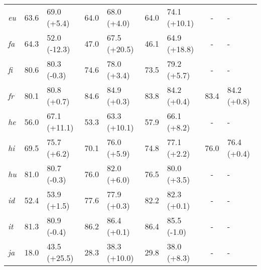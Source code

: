 \documentclass[11pt,dvipsnames]{article}
\begin{document}
\begin{table*}[ht!]
\begin{tabular}{lcccccccccccc}
\textit{eu}&63.6&\multicolumn{2}{l}{\cellcolor[HTML]{7DCEA0} 69.0 (+5.4)}&64.0&\multicolumn{2}{l}{\cellcolor[HTML]{A9DFBF} 68.0 (+4.0)}&64.0&\multicolumn{2}{l}{\cellcolor[HTML]{52BE80} 74.1 (+10.1)}&-&\multicolumn{2}{l}{-}\\
\textit{fa}&64.3&\multicolumn{2}{l}{\cellcolor[HTML]{F1948A} 52.0 (-12.3)}&47.0&\multicolumn{2}{l}{\cellcolor[HTML]{52BE80} 67.5 (+20.5)}&46.1&\multicolumn{2}{l}{\cellcolor[HTML]{52BE80} 64.9 (+18.8)}&-&\multicolumn{2}{l}{-}\\
\textit{fi}&80.6&\multicolumn{2}{l}{\cellcolor[HTML]{FDEDEC} 80.3 (-0.3)}&74.6&\multicolumn{2}{l}{\cellcolor[HTML]{A9DFBF} 78.0 (+3.4)}&73.5&\multicolumn{2}{l}{\cellcolor[HTML]{7DCEA0} 79.2 (+5.7)}&-&\multicolumn{2}{l}{-}\\
\textit{fr}&80.1&\multicolumn{2}{l}{\cellcolor[HTML]{E9F7EF} 80.8 (+0.7)}&84.6&\multicolumn{2}{l}{\cellcolor[HTML]{E9F7EF} 84.9 (+0.3)}&83.8&\multicolumn{2}{l}{\cellcolor[HTML]{E9F7EF} 84.2 (+0.4)}&83.4&\multicolumn{2}{l}{\cellcolor[HTML]{E9F7EF} 84.2 (+0.8)}\\
\textit{he}&56.0&\multicolumn{2}{l}{\cellcolor[HTML]{52BE80} 67.1 (+11.1)}&53.3&\multicolumn{2}{l}{\cellcolor[HTML]{52BE80} 63.3 (+10.1)}&57.9&\multicolumn{2}{l}{\cellcolor[HTML]{7DCEA0} 66.1 (+8.2)}&-&\multicolumn{2}{l}{-}\\
\textit{hi}&69.5&\multicolumn{2}{l}{\cellcolor[HTML]{7DCEA0} 75.7 (+6.2)}&70.1&\multicolumn{2}{l}{\cellcolor[HTML]{7DCEA0} 76.0 (+5.9)}&74.8&\multicolumn{2}{l}{\cellcolor[HTML]{A9DFBF} 77.1 (+2.2)}&76.0&\multicolumn{2}{l}{\cellcolor[HTML]{E9F7EF} 76.4 (+0.4)}\\
\textit{hu}&81.0&\multicolumn{2}{l}{\cellcolor[HTML]{FDEDEC} 80.7 (-0.3)}&76.0&\multicolumn{2}{l}{\cellcolor[HTML]{7DCEA0} 82.0 (+6.0)}&76.5&\multicolumn{2}{l}{\cellcolor[HTML]{A9DFBF} 80.0 (+3.5)}&-&\multicolumn{2}{l}{-}\\
\textit{id}&52.4&\multicolumn{2}{l}{\cellcolor[HTML]{A9DFBF} 53.9 (+1.5)}&77.6&\multicolumn{2}{l}{\cellcolor[HTML]{E9F7EF} 77.9 (+0.3)}&82.2&\multicolumn{2}{l}{\cellcolor[HTML]{E9F7EF} 82.3 (+0.1)}&-&\multicolumn{2}{l}{-}\\
\textit{it}&81.3&\multicolumn{2}{l}{\cellcolor[HTML]{FDEDEC} 80.9 (-0.4)}&86.2&\multicolumn{2}{l}{\cellcolor[HTML]{E9F7EF} 86.4 (+0.1)}&86.4&\multicolumn{2}{l}{\cellcolor[HTML]{FADBD8} 85.5 (-1.0)}&-&\multicolumn{2}{l}{-}\\
\textit{ja}&18.0&\multicolumn{2}{l}{\cellcolor[HTML]{52BE80} 43.5 (+25.5)}&28.3&\multicolumn{2}{l}{\cellcolor[HTML]{52BE80} 38.3 (+10.0)}&29.8&\multicolumn{2}{l}{\cellcolor[HTML]{7DCEA0} 38.0 (+8.3)}&-&\multicolumn{2}{l}{-}\\

\end{tabular}
\end{table*}
\end{document}
